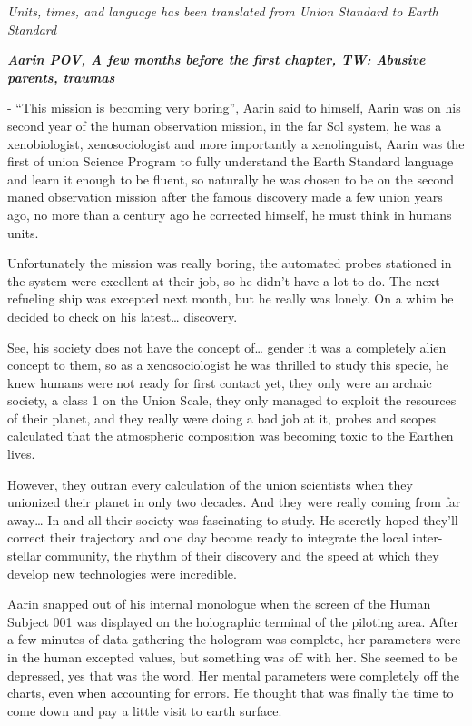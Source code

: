 \documentclass[hidelinks,12pt,a4paper]{book}
\begin{document}
\textit{Units, times, and language has been translated from Union Standard to Earth Standard}\par
\textit{\textbf{Aarin POV, A few months before the first chapter, TW: Abusive parents, traumas}} \par
\bigskip
- “This mission is becoming very boring”, Aarin said to himself,
Aarin was on his second year of the human observation mission, in the far Sol system, 
he was a xenobiologist, xenosociologist and more importantly a xenolinguist, 
Aarin was the first of \gls{union} Science Program to fully understand the Earth Standard language and 
learn it enough to be fluent, so naturally he was chosen to be on the second maned observation mission after the 
famous discovery made a few union years ago, no more than a century ago he corrected himself, he must think in humans units.\par
\bigskip

Unfortunately the mission was really boring, the automated probes stationed in the system were 
excellent at their job, so he didn't have a lot to do. The next refueling ship was excepted next 
month, but he really was lonely. On a whim he decided to check on his latest… discovery.\par
\bigskip

See, his society does not have the concept of… gender it was a completely alien concept to them, so as a 
xenosociologist he was thrilled to study this specie, he knew humans were not ready for first contact yet, 
they only were an archaic society, a class 1 on the Union Scale, they only managed to exploit the resources of their 
planet, and they really were doing a bad job at it, probes and scopes calculated that the atmospheric composition was 
becoming toxic to the Earthen lives.\par
\bigskip

However, they outran every calculation of the union scientists when they unionized their planet in only two decades. 
And they were really coming from far away… In and all their society was fascinating to study. 
He secretly hoped they'll correct their trajectory and one day become ready to integrate the local inter-stellar community, 
the rhythm of their discovery and the speed at which they develop new technologies were incredible.\par
\bigskip

Aarin snapped out of his internal monologue when the screen of the Human Subject 001 was displayed on the holographic terminal of the piloting area.
After a few minutes of data-gathering the hologram was complete, her parameters were in the human excepted values, 
but something was off with her. She seemed to be depressed, yes that was the word. Her mental parameters were completely 
off the charts, even when accounting for errors. He thought that was finally the time to come down and pay a little visit 
to earth surface.\par
\bigskip
\end{document}
